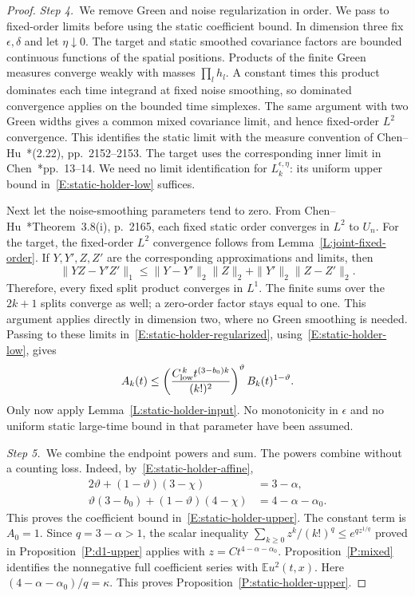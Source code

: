 \documentclass[12pt,oneside,openany]{book}
\numberwithin{equation}{section}
\theoremstyle{nogostyle}
\theoremstyle{definition}
\newcommand{\E}{\mathbb{E}}
\begin{document}
\begin{proof}
  \medskip
  \noindent\textit{Step 4.~}We remove Green and noise regularization in order.
  We pass to fixed-order limits before using the static coefficient bound. In
  dimension three fix $\epsilon,\delta$ and let $\eta\downarrow0$. The target
  and static smoothed covariance factors are bounded continuous functions of the
  spatial positions. Products of the finite Green measures converge weakly with
  masses $\prod_lh_l$. A constant times this product dominates each time
  integrand at fixed noise smoothing, so dominated convergence applies on the
  bounded time simplexes. The same argument with two Green widths gives a common
  mixed covariance limit, and hence fixed-order $L^2$ convergence. This
  identifies the static limit with the measure convention of
  Chen--Hu~\cite{chen.hu:25:hyperbolic}*{(2.22), pp.~2152--2153}. The target
  uses the corresponding inner limit in
  Chen~\cite{chen:author2026:time-dependency}*{pp.~13--14}. We need no limit
  identification for $L_k^{\epsilon,\eta}$: its uniform upper bound
  in~\eqref{E:static-holder-low} suffices.

  Next let the noise-smoothing parameters tend to zero. From
  Chen--Hu~\cite{chen.hu:25:hyperbolic}*{Theorem~3.8(i), p.~2165}, each fixed
  static order converges in $L^2$ to $U_n$. For the target, the fixed-order
  $L^2$ convergence follows from Lemma~\ref{L:joint-fixed-order}. If $Y,Y',Z,Z'$
  are the corresponding approximations and limits, then
  \[
    \|YZ-Y'Z'\|_1
    \le\|Y-Y'\|_2\|Z\|_2+\|Y'\|_2\|Z-Z'\|_2.
  \]
  Therefore, every fixed split product converges in $L^1$. The finite sums over
  the $2k+1$ splits converge as well; a zero-order factor stays equal to one.
  This argument applies directly in dimension two, where no Green smoothing is
  needed. Passing to these limits in~\eqref{E:static-holder-regularized},
  using~\eqref{E:static-holder-low}, gives
  \[
    A_k(t)\le
    \left(\frac{C_{\rm low}^{\,k}t^{(3-b_0)k}}{(k!)^2}\right)^\vartheta
    B_k(t)^{1-\vartheta}.
  \]
  Only now apply Lemma~\ref{L:static-holder-input}. No monotonicity in
  $\epsilon$ and no uniform static large-time bound in that parameter have been
  assumed.


  \medskip
  \noindent\textit{Step 5.~}We combine the endpoint powers and sum.
  The powers combine without a counting loss. Indeed,
  by~\eqref{E:static-holder-affine},
  \[
    \begin{split}
      2\vartheta+(1-\vartheta)(3-\chi)&=3-\alpha,\\
      \vartheta(3-b_0)+(1-\vartheta)(4-\chi)
      &=4-\alpha-\alpha_0.
    \end{split}
  \]
  This proves the coefficient bound in~\eqref{E:static-holder-upper}. The
  constant term is $A_0 = 1$. Since $q = 3-\alpha > 1$, the scalar inequality
  $\sum_{k\ge0}z^k/(k!)^q \le e^{qz^{1/q}}$ proved in
  Proposition~\ref{P:d1-upper} applies with $z = Ct^{4-\alpha-\alpha_0}$.
  Proposition~\ref{P:mixed} identifies the nonnegative full coefficient series
  with $\E u^2(t,x)$. Here $(4-\alpha-\alpha_0)/q = \kappa$. This proves
  Proposition~\ref{P:static-holder-upper}.
\end{proof}
\end{document}
